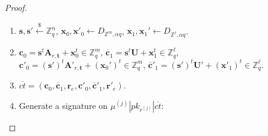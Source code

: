 \documentclass[a4paper,11pt,onecolumn]{elsarticle}
\begin{document}
\begin{proof}
\begin{itemize}
\begin{enumerate}
			\item $\textbf{s}, \textbf{s}' \xleftarrow{\$} \mathbb{Z}_q^{n}$, \quad $\textbf{x}_0, \textbf{x}'_0\leftarrow D_{\mathbb{Z}^{m}, \alpha q}$, \quad  $\textbf{x}_1, \textbf{x}_1'\leftarrow D_{\mathbb{Z}^{\ell}, \alpha q}$.
			\item $\textbf{c}_0=\textbf{s}^t\textbf{A}_{r,\textbf{t}}+ \textbf{x}^t_0 \in \mathbb{Z}_q^{m}$, \quad \quad \quad  $\overline{\textbf{c}}_1=\textbf{s}^t\textbf{U}+ \textbf{x}^t_1 \in \mathbb{Z}_q^{\ell}$,\\
			$\textbf{c}'_0=(\textbf{s}')^t\textbf{A}'_{r,\textbf{t}}+ (\textbf{x}_0')^t \in \mathbb{Z}_q^{m}$, \quad  $\overline{\textbf{c}}'_1=(\textbf{s}')^t\textbf{U}'+ (\textbf{x}'_1)^t \in \mathbb{Z}_q^{\ell}$.
			\item $\overline{ct}=(\textbf{c}_0, \overline{\textbf{c}}_1, \textbf{r}_e, \textbf{c}'_0, \overline{\textbf{c}}'_1, \textbf{r}'_e)$.%
			
		
			\item Generate a signature on $\mu^{(j)}| pk_{r^{(j)}}|\overline{ct}$:
			\begin{enumerate}
		

\end{enumerate}
\end{enumerate}
\end{itemize}
\end{proof}
\end{document}
